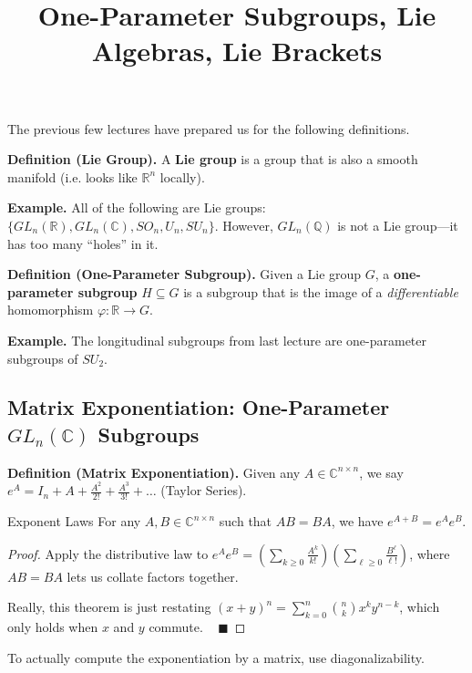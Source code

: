 \title{One-Parameter Subgroups, Lie Algebras, Lie Brackets}



The previous few lectures have prepared us for the following definitions.

\textbf{Definition (Lie Group).} A \textbf{Lie group} is a group that is also a smooth manifold (i.e. looks like $\mathbb{R}^n$ locally).

\textbf{Example.} All of the following are Lie groups: $\{GL_n(\mathbb{R}), GL_n(\mathbb{C}), SO_n, U_n, SU_n\}$.  However, $GL_n(\mathbb{Q})$ is not a Lie group---it has too many ``holes'' in it.

\textbf{Definition (One-Parameter Subgroup).} Given a Lie group $G$, a \textbf{one-parameter subgroup} $H \subseteq G$ is a subgroup that is the image of a \textit{differentiable} homomorphism $\varphi: \mathbb{R} \to G$.

\textbf{Example.} The longitudinal subgroups from last lecture are one-parameter subgroups of $SU_2$.

\subsection{Matrix Exponentiation: One-Parameter $GL_n(\mathbb{C})$ Subgroups}

\textbf{Definition (Matrix Exponentiation).} Given any $A \in \mathbb{C}^{n \times n}$, we say $e^A = I_n + A + \frac{A^2}{2!} + \frac{A^3}{3!} + \dots$ (Taylor Series).

\begin{theorem}{Exponent Laws}
    For any $A, B \in \mathbb{C}^{n \times n}$ such that $AB = BA$, we have $e^{A + B} = e^A e^B$.
\end{theorem}

\begin{proof}
    Apply the distributive law to $e^Ae^B = \left(\sum_{k \geq 0} \frac{A^k}{k!}\right)\left(\sum_{\ell \geq 0} \frac{B^{\ell}}{\ell!}\right)$, where $AB = BA$ lets us collate factors together.

    Really, this theorem is just restating $(x + y)^n = \sum_{k = 0}^n \binom{n}{k}x^ky^{n - k}$, which only holds when $x$ and $y$ commute. ~ $\blacksquare$
\end{proof}

To actually compute the exponentiation by a matrix, use diagonalizability.

